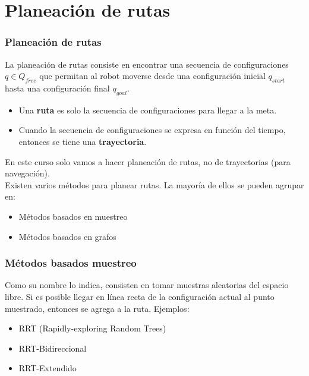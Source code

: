 \section{Planeación de rutas}
\begin{frame}\frametitle{Planeación de rutas}
  La planeación de rutas consiste en encontrar una secuencia de configuraciones $q\in Q_{free}$ que permitan al robot moverse desde una configuración inicial $q_{start}$ hasta una configuración final $q_{goal}$.
  \begin{itemize}
  \item Una \textbf{ruta} es solo la secuencia de configuraciones para llegar a la meta.
  \item Cuando la secuencia de configuraciones se expresa en función del tiempo, entonces se tiene una \textbf{trayectoria}. 
  \end{itemize}
  En este curso solo vamos a hacer planeación de rutas, no de trayectorias (para navegación).\\
  Existen varios métodos para planear rutas. La mayoría de ellos se pueden agrupar en:
  \begin{itemize}
  \item Métodos basados en muestreo
  \item Métodos basados en grafos
  \end{itemize}
\end{frame}

\begin{frame}\frametitle{Métodos basados muestreo}
  Como su nombre lo indica, consisten en tomar muestras aleatorias del espacio libre. Si es posible llegar en línea recta de la configuración actual al punto muestrado, entonces se agrega a la ruta.
  Ejemplos:
  \begin{itemize}
  \item RRT (Rapidly-exploring Random Trees)
  \item RRT-Bidireccional
  \item RRT-Extendido
  \end{itemize}
\end{frame}

